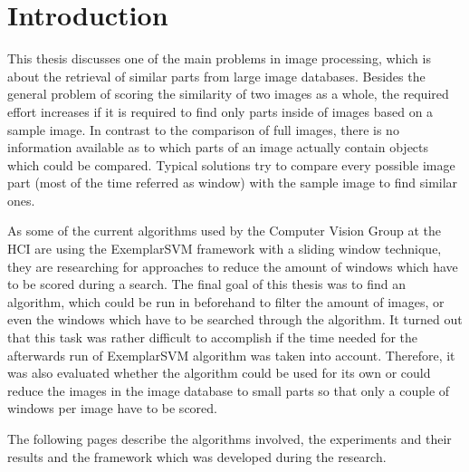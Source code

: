 \chapter{Introduction}


This thesis discusses one of the main problems in image processing, which is about the retrieval of similar parts from large image databases.
Besides the general problem of scoring the similarity of two images as a whole, the required effort increases if it is required to find only parts inside of images based on a sample image. In contrast to the comparison of full images, there is no information available as to which parts of an image actually contain objects which could be compared.
Typical solutions try to compare every possible image part (most of the time referred as window) with the sample image to find similar ones.
\bigskip

As some of the current algorithms used by the Computer Vision Group at the \ac{HCI} are using the ExemplarSVM \cite{Malisiewicz2011} framework with a sliding window technique, they are researching for approaches to reduce the amount of windows which have to be scored during a search. 
The final goal of this thesis was to find an algorithm, which could be run in beforehand to filter the amount of images, or even the windows which have to be searched through the algorithm. It turned out that this task was rather difficult to accomplish if the time needed for the afterwards run of ExemplarSVM algorithm was taken into account. Therefore, it was also evaluated whether the algorithm could be used for its own or could reduce the images in the image database to small parts so that only a couple of windows per image have to be scored.

The following pages describe the algorithms involved, the experiments and their results and the framework which was developed during the research.
